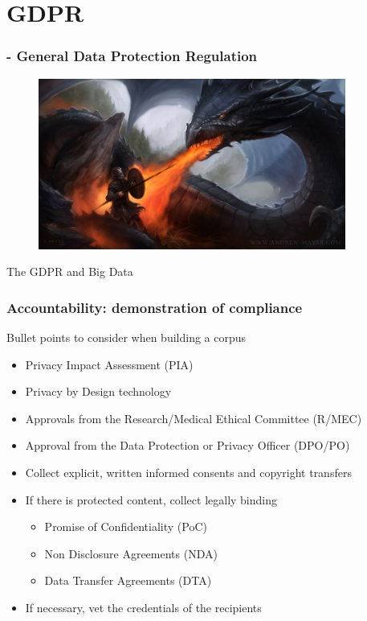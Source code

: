 \documentclass[xcolor=dvipsnames]{beamer}
\begin{document}
\section{GDPR}
\begin{frame}
	\frametitle{\insertsection - General Data Protection Regulation}
	
	\begin{center}
	\begin{figure}
	{\includegraphics[width=0.90\textwidth]{Pictures/DragonAttack}}
	\end{figure}
	The GDPR and Big Data
	\end{center}
	\let\thefootnote\relax{}
\end{frame}


\begin{frame}[label=Accountability]
	\frametitle{Accountability: demonstration of compliance}
	
	\begin{block}{Bullet points to consider when building a corpus}
	\begin{itemize}
	\item Privacy Impact Assessment (PIA)
	\item Privacy by Design technology
	\item Approvals from the Research/Medical Ethical Committee (R/MEC)
	\item Approval from the Data Protection or Privacy Officer (DPO/PO)
	\item Collect explicit, written informed consents and copyright transfers
	\vskip 0.5cm
	\item If there is protected content, collect legally binding
	\begin{itemize}
	\item Promise of Confidentiality (PoC)
	\item Non Disclosure Agreements (NDA)
	\item Data Transfer Agreements (DTA)
	\end{itemize}
	\item If necessary, vet the credentials of the recipients
	\end{itemize}
	\end{block}	

\end{frame}
\end{document}
